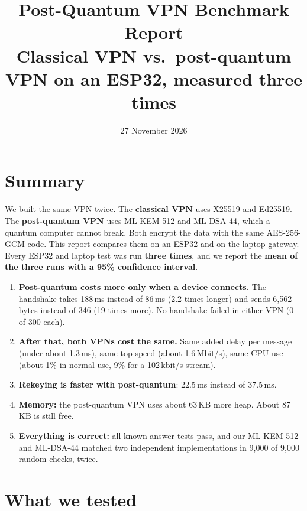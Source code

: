 \documentclass[10pt,a4paper]{article}
\title{Post-Quantum VPN Benchmark Report\\[3pt]
\large Classical VPN vs.\ post-quantum VPN on an ESP32, measured three times}
\author{}
\date{27 November 2026}
\begin{document}
\maketitle

\section*{Summary}

We built the same VPN twice. The \textbf{classical VPN} uses X25519 and Ed25519. The
\textbf{post-quantum VPN} uses ML-KEM-512 and ML-DSA-44, which a quantum computer cannot break.
Both encrypt the data with the same AES-256-GCM code. This report compares them on an ESP32 and on the
laptop gateway. Every ESP32 and laptop test was run \textbf{three times}, and we report the
\textbf{mean of the three runs with a 95\% confidence interval}.

\begin{enumerate}[nosep]
  \item \textbf{Post-quantum costs more only when a device connects.} The handshake takes
        188\,ms instead of 86\,ms (2.2 times longer) and sends 6,562 bytes instead of 346 (19 times more).
        No handshake failed in either VPN (0 of 300 each).
  \item \textbf{After that, both VPNs cost the same.} Same added delay per message (under about
        1.3\,ms), same top speed (about 1.6\,Mbit/s), same CPU use (about 1\% in normal use, 9\% for a
        102\,kbit/s stream).
  \item \textbf{Rekeying is faster with post-quantum}: 22.5\,ms instead of 37.5\,ms.
  \item \textbf{Memory:} the post-quantum VPN uses about 63\,KB more heap. About 87\,KB is still free.
  \item \textbf{Everything is correct:} all known-answer tests pass, and our ML-KEM-512 and ML-DSA-44
        matched two independent implementations in 9,000 of 9,000 random checks, twice.
\end{enumerate}

\section{What we tested}
\end{document}

